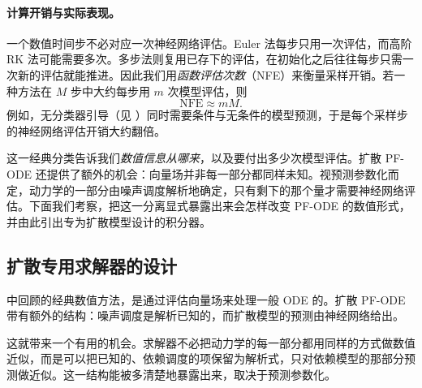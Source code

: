 \paragraph{计算开销与实际表现。}
一个数值时间步不必对应一次神经网络评估。Euler 法每步只用一次评估，而高阶 RK 法可能需要多次。多步法则复用已存下的评估，在初始化之后往往每步只需一次新的评估就能推进。因此我们用\emph{函数评估次数}（NFE）来衡量采样开销。若一种方法在 $M$ 步中大约每步用 $m$ 次模型评估，则
\[
\mathrm{NFE}\approx mM.
\]
例如，无分类器引导（见 ）同时需要条件与无条件的模型预测，于是每个采样步的神经网络评估开销大约翻倍。

这一经典分类告诉我们\emph{数值信息从哪来}，以及要付出多少次模型评估。扩散 PF-ODE 还提供了额外的机会：向量场并非每一部分都同样未知。视预测参数化而定，动力学的一部分由噪声调度解析地确定，只有剩下的那个量才需要神经网络评估。下面我们考察，把这一分离显式暴露出来会怎样改变 PF-ODE 的数值形式，并由此引出专为扩散模型设计的积分器。


\subsection{扩散专用求解器的设计}
\label{subsec:common_design_solvers}

 中回顾的经典数值方法，是通过评估向量场来处理一般 ODE 的。扩散 PF-ODE 带有额外的结构：噪声调度是解析已知的，而扩散模型的预测由神经网络给出。

这就带来一个有用的机会。求解器不必把动力学的每一部分都用同样的方式做数值近似，而是可以把已知的、依赖调度的项保留为解析式，只对依赖模型的那部分预测做近似。这一结构能被多清楚地暴露出来，取决于预测参数化。



